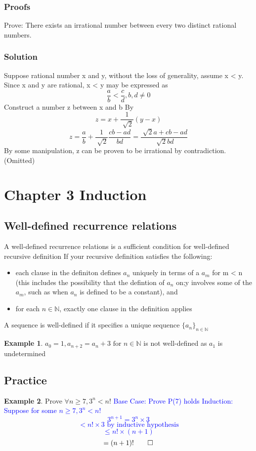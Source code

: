 \documentclass[14pt]{article}
\theoremstyle{definition}
\newtheorem*{example}{Example}
\begin{document}
\subsubsection{Proofs}
Prove: There exists an irrational number between every two distinct rational numbers.
\subsubsection*{Solution}
Suppose rational number x and y, without the loss of generality, assume x < y. Since x and y are rational, x < y may be expressed as 
\[\frac{a}{b} < \frac{c}{d}, b, d \neq 0\]
Construct a number z between x and b By
\[z = x + \frac{1}{\sqrt[]{2}} (y - x)\]
\[z = \frac{a}{b} + \frac{1}{\sqrt[]{2}} \frac{cb - ad}{bd} = \frac{\sqrt[]{2}a + cb - ad}{\sqrt[]{2} bd}\]
By some manipulation, z can be proven to be irrational by contradiction. (Omitted)

\section{Chapter 3 Induction}
\subsection{Well-defined recurrence relations}
A well-defined recurrence relations is a sufficient condition for well-defined recursive definition
If your recursive definition satisfies the following: 
\begin{itemize}
    \item each clause in the definiton defines \(a_n\) uniquely in terms of a \(a_m\) for m < n (this includes the possibility that the defintion of \(a_n\) on;y involves some of the \(a_m\), such as when \(a_n\) is defined to be a constant), and
    \item for each \(n \in \mathbb{N}\), exactly one clause in the definition applies
\end{itemize}
A sequence is well-defined if it specifies a unique sequence \(\{a_n\}_{n \in \mathbb{N}}\)
\begin{example}
    \(a_0 = 1, a_{n+2} = a_n + 3 \text{ for } n \in \mathbb{N} \) is not well-defined as \(a_1\) is undetermined
\end{example}

\subsection*{Practice}
\begin{example}
    Prove \(\forall n \geq 7, 3^n < n!\) \newline
    \textcolor{blue}{
    Base Case: Prove P(7) holds \newline
    Induction: Suppose for some $n \geq 7, 3^n < n!$ 
    \[3^{n+1} = 3^n \times 3\]
    \[< n! \times 3 \text{   by inductive hypothesis}\]  
    \[\leq n!\times (n + 1)\]
    \[= (n + 1)! \qed\]}
\end{example}
\end{document}
